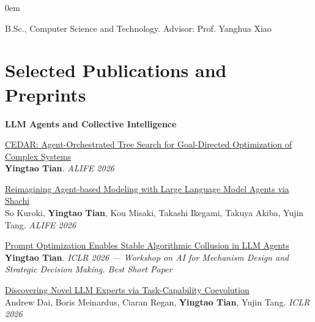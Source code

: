\documentclass[line,margin]{cv}
\newenvironment{block}
{
  \begin{addmargin}[2em]{0em}%
}
{
  \end{addmargin}
}
\begin{document}
\begin{resume}
  \begin{block}
    B.Sc., Computer Science and Technology. Advisor: Prof. Yanghua Xiao
  \end{block}

\section{Selected Publications and Preprints}

\textbf{LLM Agents and Collective Intelligence}

{\small
\setlength{\parskip}{0.5ex plus 0.1ex minus 0.1ex}

  \begin{samepage}
  \href{https://arxiv.org/abs/2608.06871}{CEDAR: Agent-Orchestrated Tree Search for Goal-Directed Optimization of Complex Systems}\\
  \textbf{Yingtao Tian}. \emph{ALIFE 2026}
  \par\end{samepage}

  \begin{samepage}
  \href{https://arxiv.org/abs/2509.21862}{Reimagining Agent-based Modeling with Large Language Model Agents via Shachi}\\
  So Kuroki, \textbf{Yingtao Tian}, Kou Misaki, Takashi Ikegami, Takuya Akiba, Yujin Tang. \emph{ALIFE 2026}
  \par\end{samepage}

  \begin{samepage}
  \href{https://arxiv.org/abs/2604.17774}{Prompt Optimization Enables Stable Algorithmic Collusion in LLM Agents}\\
  \textbf{Yingtao Tian}. \emph{ICLR 2026 --- Workshop on AI for Mechanism Design and Strategic Decision Making. Best Short Paper}
  \par\end{samepage}

  \begin{samepage}
  \href{https://openreview.net/forum?id=efNINVs2So}{Discovering Novel LLM Experts via Task-Capability Coevolution}\\
  Andrew Dai, Boris Meinardus, Ciaran Regan, \textbf{Yingtao Tian}, Yujin Tang. \emph{ICLR 2026}
  \par\end{samepage}

}
\end{resume}
\end{document}
